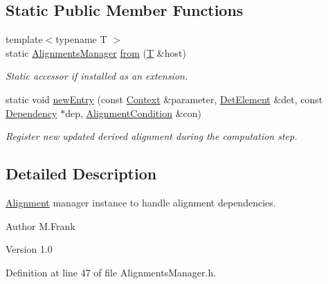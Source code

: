 \subsection*{Static Public Member Functions}
\begin{DoxyCompactItemize}
\item 
{\footnotesize template$<$typename T $>$ }\\static \hyperlink{class_d_d4hep_1_1_alignments_1_1_alignments_manager}{AlignmentsManager} \hyperlink{class_d_d4hep_1_1_alignments_1_1_alignments_manager_ad1677dd241c59534c19caee3b88a3c9f}{from} (\hyperlink{class_t}{T} \&host)
\begin{DoxyCompactList}\small\item\em Static accessor if installed as an extension. \item\end{DoxyCompactList}\item 
static void \hyperlink{class_d_d4hep_1_1_alignments_1_1_alignments_manager_a193ada1fb36be0e72fa92f83a4610c80}{newEntry} (const \hyperlink{class_d_d4hep_1_1_conditions_1_1_condition_update_context}{Context} \&parameter, \hyperlink{namespace_d_d4hep_a21dd977310ff183f61ca6ae14b59a989}{DetElement} \&det, const \hyperlink{class_d_d4hep_1_1_conditions_1_1_condition_dependency}{Dependency} $\ast$dep, \hyperlink{class_d_d4hep_1_1_alignments_1_1_alignment_condition}{AlignmentCondition} \&con)
\begin{DoxyCompactList}\small\item\em Register new updated derived alignment during the computation step. \item\end{DoxyCompactList}\end{DoxyCompactItemize}


\subsection{Detailed Description}
\hyperlink{class_d_d4hep_1_1_alignments_1_1_alignment}{Alignment} manager instance to handle alignment dependencies. \begin{DoxyAuthor}{Author}
M.Frank 
\end{DoxyAuthor}
\begin{DoxyVersion}{Version}
1.0 
\end{DoxyVersion}


Definition at line 47 of file AlignmentsManager.h.


